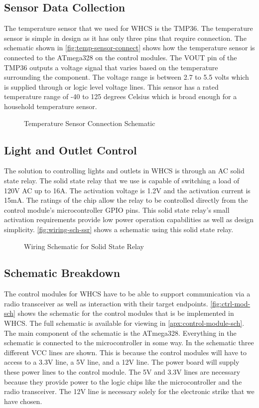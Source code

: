 \documentclass[draft,twocolumn,letterpaper,10pt]{IEEEtran}
\newcommand{\ucffig}[3]{
\begin{figure}[h]
\centering
\makebox[\linewidth][c]{
#2
}
\caption{#3}
\label{#1}
\end{figure}
}
\newcommand{\ucfgfx}[4][scale=1.0]{
\ucffig{#2}{\texttt{[image: \#3]}}{#4}
}
\begin{document}
\subsection{Sensor Data Collection}
The temperature sensor that we used for WHCS is the TMP36. The temperature
sensor is simple in design as it has only three pins that require connection.
The schematic shown in \autoref{fig:temp-sensor-connect} shows how the
temperature sensor is connected to the ATmega328 on the control modules. The
VOUT pin of the TMP36 outputs a voltage signal that varies based on the
temperature surrounding the component.  The voltage range is between 2.7 to 5.5
volts which is supplied through or logic level voltage lines. This sensor has a
rated temperature range of -40 to 125 degrees Celsius which is broad enough for
a household temperature sensor.

\ucfgfx[width=\linewidth]{fig:temp-sensor-connect}
{a683SensorCollectionexpected2pages-img001.png}{Temperature Sensor Connection Schematic}

\subsection{Light and Outlet Control}
The solution to controlling lights and outlets in WHCS is through an AC solid
state relay. The solid state relay that we use is capable of switching a load
of 120V AC up to 16A. The activation voltage is 1.2V and the activation current
is 15mA. The ratings of the chip allow the relay to be controlled directly from
the control module’s microcontroller GPIO pins. This solid state relay’s small
activation requirements provide low power operation capabilities as well as
design simplicity. \autoref{fig:wiring-sch-ssr} shows a schematic using this
solid state relay.

\ucfgfx[width=\linewidth]{fig:wiring-sch-ssr}{a684LightandOutletControl-img001.png}{
Wiring Schematic for Solid State Relay}

\subsection{Schematic Breakdown}
The control modules for WHCS have to be able to support communication via a
radio transceiver as well as interaction with their target endpoints.
\autoref{fig:ctrl-mod-sch} shows the schematic for the control modules that is be
implemented in WHCS. The full schematic is available for viewing in \autoref{apx:control-module-sch}. The main component of the schematic is the ATmega328.
Everything in the schematic is connected to the microcontroller in some way. In
the schematic three different VCC lines are shown. This is because the control
modules will have to access to a 3.3V line, a 5V line, and a 12V line. The
power board will supply these power lines to the control module. The 5V and
3.3V lines are necessary because they provide power to the logic chips like the
microcontroller and the radio transceiver. The 12V line is necessary solely for
the electronic strike that we have chosen.
\end{document}
